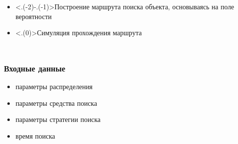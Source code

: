 \documentclass{beamer} %
\theoremstyle{definition} %
\begin{document}
\begin{comment}
\begin{frame}
  \frametitle{Параметры распределения}
\begin{itemize}
\item $A_{t_0} : R^2 \to R $ --- начальное распределения (аппроксимируется матрицей)
\item $f(A_t, \Delta t) = A_{t+\Delta t}$ --- функция изменения распределения
\end{itemize}
\end{frame}
\end{comment}

\begin{comment}
\begin{frame}
  \frametitle{Параметры средства поиска}
\begin{itemize}
\item $p_0$ --- начальное положение средства поиска
\item $v$ --- cкорость средства поиска
\item $r$ --- радиус обнаружения средства поиска (все частицы попавшие в круг радиуса обнаружения считаются ``собранными'')
\end{itemize}
\end{frame}
\end{comment}

\begin{comment}
\begin{frame}
  \frametitle{Параметры стратегии поиска}
  Параллельное галсирование
\begin{itemize}
  \item $l$ --- прямая параллельная направлению галсов
\end{itemize}
\end{frame}
\end{comment}

\begin{frame}
\begin{columns}
\begin{itemize}
    \item<.(-2)-.(-1)>{Построение маршрута поиска объекта, основываясь на поле вероятности}
    \item<.(0)>{Симуляция прохождения маршрута}
\end{itemize}
\end{columns}
\end{frame}

\begin{frame}
  \frametitle{Входные данные}
\begin{itemize}
\item параметры распределения
\item параметры средства поиска
\item параметры стратегии поиска
\item время поиска
\end{itemize}
\end{frame}
\end{document}

